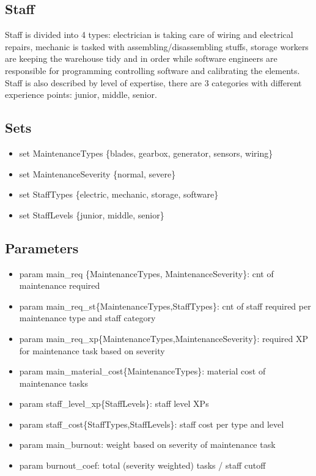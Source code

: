 \documentclass[12p,a4paper,twoside]{article}
\begin{document}
        \subsection{Staff}
        Staff is divided into 4 types: electrician is taking care of wiring and electrical repairs, 
        mechanic is tasked with assembling/disassembling stuffs, storage workers are keeping 
        the warehouse tidy and in order while software engineers are responsible for 
        programming controlling software and calibrating the elements. Staff is also described by 
        level of expertise, there are 3 categories with different experience points: junior, middle, senior.

        \subsection{Sets}
          \begin{itemize}
            \item set MaintenanceTypes \{blades, gearbox, generator, sensors, wiring\}
            \item set MaintenanceSeverity \{normal, severe\}
            \item set StaffTypes \{electric, mechanic, storage, software\}
            \item set StaffLevels \{junior, middle, senior\}
          \end{itemize}

        \subsection{Parameters}
          \begin{itemize}
            \item param main\_req \{MaintenanceTypes, MaintenanceSeverity\}: cnt of maintenance required
            \item param main\_req\_st\{MaintenanceTypes,StaffTypes\}: cnt of staff required per maintenance type and staff category
            \item param main\_req\_xp\{MaintenanceTypes,MaintenanceSeverity\}: required XP for maintenance task based on severity
            \item param main\_material\_cost\{MaintenanceTypes\}: material cost of maintenance tasks
            \item param staff\_level\_xp\{StaffLevels\}: staff level XPs
            \item param staff\_cost\{StaffTypes,StaffLevels\}: staff cost per type and level
            \item param main\_burnout: weight based on severity of maintenance task
            \item param burnout\_coef: total (severity weighted) tasks / staff cutoff
          \end{itemize}
\end{document}
